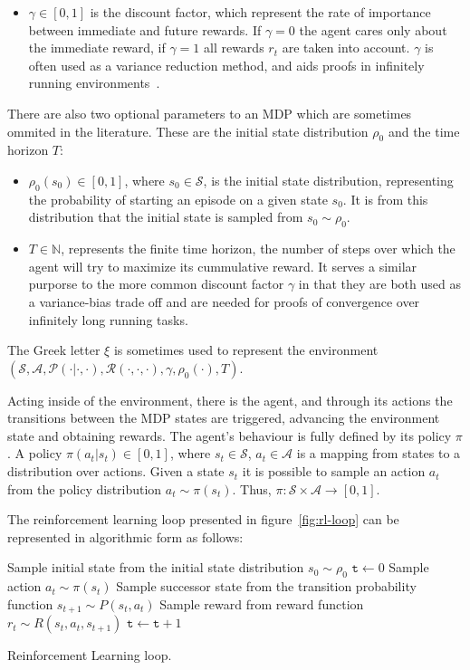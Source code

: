 \documentclass{../main.tex}{}
\newcommand{\var}{\texttt}
\begin{document}
\begin{itemize}
\item $\gamma \in [0,1]$ is the discount factor, which represent the rate of importance between immediate and future rewards. If $\gamma = 0$ the agent cares only about the immediate reward, if $\gamma = 1$ all rewards $r_t$ are taken into account. $\gamma$ is often used as a variance reduction method, and aids proofs in infinitely running environments~\citep{Sutton1999}.
\end{itemize}

There are also two optional parameters to an MDP which are sometimes ommited in the literature. These are the initial state distribution $\rho_0$ and the time horizon $T$:

\begin{itemize}
    \item $\rho_0(s_0) \in [0, 1]$, where $s_0 \in \mathcal{S}$, is the initial state distribution, representing the probability of starting an episode on a given state $s_0$. It is from this distribution that the initial state is sampled from $s_0 \sim \rho_0$.
    \item $T \in \mathbb{N}$, represents the finite time horizon, the number of steps over which the agent will try to maximize its cummulative reward. It serves a similar purporse to the more common discount factor $\gamma$ in that they are both used as a variance-bias trade off and are needed for proofs of convergence over infinitely long running tasks.
\end{itemize}

The Greek letter $\xi$ is sometimes used to represent the environment $(\mathcal{S}, \mathcal{A}, \mathcal{P(\cdot | \cdot, \cdot)}, \mathcal{R}(\cdot, \cdot, \cdot), \gamma, \rho_0(\cdot), T)$. 

Acting inside of the environment, there is the agent, and through its actions the transitions between the MDP states are triggered, advancing the environment state and obtaining rewards. The agent's behaviour is fully defined by its policy $\pi$. A policy $\pi(a_t | s_t) \in [0,1]$, where $s_t \in \mathcal{S}$, $a_t \in \mathcal{A}$ is a mapping from states to a distribution over actions. Given a state $s_t$ it is possible to sample an action $a_t$ from the policy distribution $a_t \sim \pi(s_t)$. Thus, $\pi: \mathcal{S} \times \mathcal{A} \to [0,1]$.

The reinforcement learning loop presented in figure~\ref{fig:rl-loop} can be represented in algorithmic form as follows:
\begin{algorithm}
    Sample initial state from the initial state distribution $s_0 \sim \rho_0$ \;
    $\var{t} \leftarrow 0$ \;
     {
        Sample action $a_t \sim \pi(s_t)$\;
        Sample successor state from the transition probability function $ s_{t+1} \sim P(s_t, a_t)$ \;
        Sample reward from reward function $r_t \sim R(s_t, a_t, s_{t+1})$ \;
        $\var{t} \leftarrow \var{t} + 1$ \;
    }
\caption{Reinforcement Learning loop.}\label{algorithm:rl-loop}
\end{algorithm}
\end{document}

